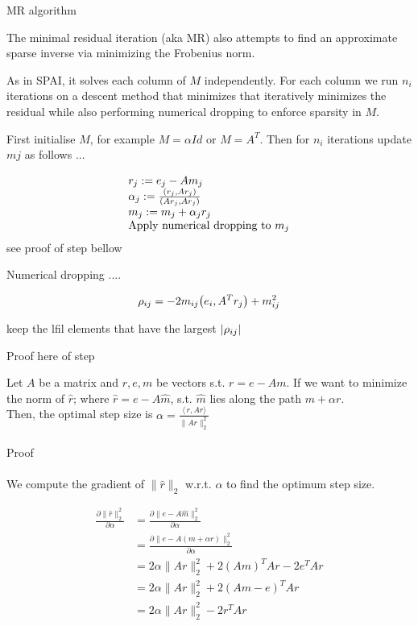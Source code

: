 \documentclass[paper=A4, fontsize=11pt]{scrartcl}
\let\originalleft\left
\let\originalright\right
\renewcommand{\left}{\mathopen{}\mathclose\bgroup\originalleft}
\renewcommand{\right}{\aftergroup\egroup\originalright}
\theoremstyle{remark}
\begin{document}
\begin{section}{MR algorithm}
	
	The minimal residual iteration (aka MR) also attempts to find an approximate sparse inverse via minimizing the Frobenius norm.
	
	As in SPAI, it solves each column of $M$ independently. For each column we run $n_{i}$ iterations on a descent method that minimizes that iteratively minimizes the residual while also performing numerical dropping to enforce sparsity in $M$.
	
	First initialise $M$, for example $M = \alpha Id$ or $M = A^{T}$.
	Then for $n_{i}$ iterations update $m{j}$ as follows ...
	
	\begin{equation}
	\begin{array}{l}{r_{j} :=e_{j}-A m_{j}} \\ {\alpha_{j} :=\frac{\left(r_{j}, A r_{j}\right)}{\left(A r_{j}, A r_{j}\right)}} \\ {m_{j} :=m_{j}+\alpha_{j} r_{j}} \\ {\text {Apply numerical dropping to } m_{j}}\end{array}
	\end{equation}
	see proof of step bellow
	
Numerical dropping ....

\begin{equation}
\rho_{i j}=-2 m_{i j}\left(e_{i}, A^{T} r_{j}\right)+m_{i j}^{2}
\end{equation}

keep the  lfil elements that have the largest $\left|\rho_{i j}\right|$

Proof here of step

Let $A$ be a matrix and $r, e, m$ be vectors s.t. $r = e - Am$. If we want to minimize the norm of $\hat{r}$; where $\hat{r} = e - A\hat{m}$, s.t. $\hat{m}$ lies along the path $m + \alpha r$. \\
Then, the optimal step size is $\alpha = \frac{\langle\,r,Ar\rangle}{\|Ar\|_{2}^{2}}$
\\\\
Proof 
\\\\
We compute the gradient of $\|\hat{r}\|_{2}$ w.r.t. $\alpha$ to find the optimum step size. 




\begin{equation}
\begin{aligned}
\frac{\partial \|\hat{r} \|_{2}^{2}}{\partial \alpha} 
& = \frac{\partial \|e - A\hat{m}\|_{2}^{2}}{\partial \alpha} \\
& = \frac{\partial \|e - A(m + \alpha r)\|_{2}^{2}}{\partial \alpha} \\
& = 2\alpha \|Ar\|_{2}^{2}  + 2(Am)^{T}Ar - 2e^{T}Ar \\
& = 2\alpha \|Ar\|_{2}^{2}  + 2(Am - e)^{T}Ar \\
& = 2\alpha \|Ar\|_{2}^{2}  - 2r^{T}Ar \\
\\
\end{aligned}
\end{equation}


\end{section}
\end{document}
